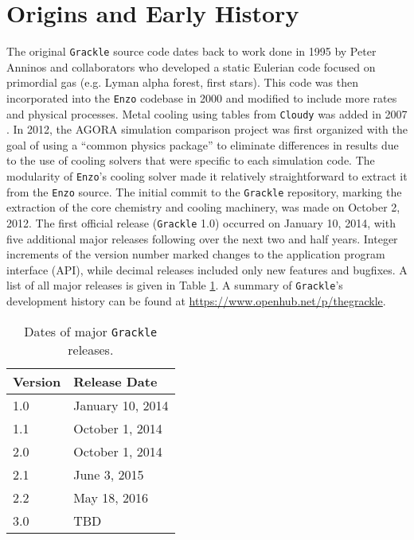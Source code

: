 \section{Origins and Early History}
\label{sec:origins}

The original \texttt{Grackle} source code dates back to work done in
1995 by Peter Anninos and collaborators
\citep{1997NewA....2..209A} who developed a static Eulerian code
focused on primordial gas (e.g. Lyman alpha forest, first stars).
This code was then incorporated into the \texttt{Enzo} codebase in 2000
and modified to include more rates and physical processes.  Metal
cooling using tables from \texttt{Cloudy} was added in 2007
\citep{2008MNRAS.385.1443S}.  In 2012, the AGORA simulation comparison
project \citep{2014ApJS..210...14K} was first organized with the goal
of using a ``common physics package'' to eliminate differences in
results due to the use of cooling solvers that were specific to each
simulation code.  The modularity of \texttt{Enzo}'s cooling solver made
it relatively straightforward to extract it from the \texttt{Enzo}
source.  The initial commit to the \texttt{Grackle} repository,
marking the extraction of the core chemistry and cooling machinery,
was made on October 2, 2012.  The first official release
(\texttt{Grackle} 1.0) occurred on January 10, 2014, with five
additional major releases following over the next two and half years.
Integer increments of the version number marked changes to the
application program interface (API), while decimal releases included
only new features and bugfixes.  A list of all major releases is given
in Table \ref{tab:releases}.  A summary of \texttt{Grackle}'s
development history can be found at
\url{https://www.openhub.net/p/thegrackle}.

\begin{table}
  \centering
  \caption{Dates of major \texttt{Grackle} releases.}
  \label{tab:releases}
  \begin{tabular}{ll}
    \hline
    Version & Release Date\\
    \hline
    1.0 & January 10, 2014\\
    1.1 & October 1, 2014\\
    2.0 & October 1, 2014\\
    2.1 & June 3, 2015\\
    2.2 & May 18, 2016\\
    3.0 & TBD\\
    \hline
  \end{tabular}
\end{table}
